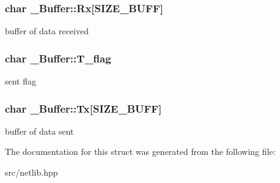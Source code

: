 \subsubsection[{\texorpdfstring{Rx}{Rx}}]{\setlength{\rightskip}{0pt plus 5cm}char \+\_\+\+Buffer\+::\+Rx\mbox{[}S\+I\+Z\+E\+\_\+\+B\+U\+FF\mbox{]}}\hypertarget{struct___buffer_a8c44c403d9e3f8ddefd09d410312375b}{}\label{struct___buffer_a8c44c403d9e3f8ddefd09d410312375b}
buffer of data received 
\subsubsection[{\texorpdfstring{T\+\_\+flag}{T_flag}}]{\setlength{\rightskip}{0pt plus 5cm}char \+\_\+\+Buffer\+::\+T\+\_\+flag}\hypertarget{struct___buffer_a458c1db99177167836af8505dea8bae3}{}\label{struct___buffer_a458c1db99177167836af8505dea8bae3}
sent flag 
\subsubsection[{\texorpdfstring{Tx}{Tx}}]{\setlength{\rightskip}{0pt plus 5cm}char \+\_\+\+Buffer\+::\+Tx\mbox{[}S\+I\+Z\+E\+\_\+\+B\+U\+FF\mbox{]}}\hypertarget{struct___buffer_a803fdcb8a3d9d6358bf64aa8b311cb80}{}\label{struct___buffer_a803fdcb8a3d9d6358bf64aa8b311cb80}
buffer of data sent 

The documentation for this struct was generated from the following file\+:\begin{DoxyCompactItemize}
\item 
src/netlib.\+hpp\end{DoxyCompactItemize}
